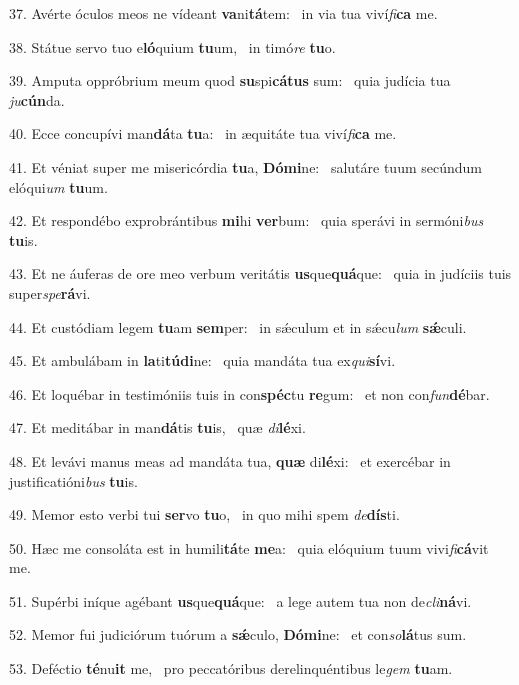 37. Avérte óculos meos ne vídeant \textbf{va}ni\textbf{tá}tem: \ast\  in via tua viví\textit{fi}\textbf{ca} me.\

38. Státue servo tuo e\textbf{ló}quium \textbf{tu}um, \ast\  in timó\textit{re} \textbf{tu}o.\

39. Amputa oppróbrium meum quod \textbf{su}spi\textbf{cá}\textbf{tus} sum: \ast\  quia judícia tua \textit{ju}\textbf{cún}da.\

40. Ecce concupívi man\textbf{dá}ta \textbf{tu}a: \ast\  in æquitáte tua viví\textit{fi}\textbf{ca} me.\

41. Et véniat super me misericórdia \textbf{tu}a, \textbf{Dó}\textbf{mi}ne: \ast\  salutáre tuum secúndum elóqui\textit{um} \textbf{tu}um.\

42. Et respondébo exprobrántibus \textbf{mi}hi \textbf{ver}bum: \ast\  quia sperávi in sermóni\textit{bus} \textbf{tu}is.\

43. Et ne áuferas de ore meo verbum veritátis \textbf{us}que\textbf{quá}que: \ast\  quia in judíciis tuis super\textit{spe}\textbf{rá}vi.\

44. Et custódiam legem \textbf{tu}am \textbf{sem}per: \ast\  in sǽculum et in sǽcu\textit{lum} \textbf{sǽ}culi.\

45. Et ambulábam in \textbf{la}ti\textbf{tú}\textbf{di}ne: \ast\  quia mandáta tua ex\textit{qui}\textbf{sí}vi.\

46. Et loquébar in testimóniis tuis in con\textbf{spéc}tu \textbf{re}gum: \ast\  et non con\textit{fun}\textbf{dé}bar.\

47. Et meditábar in man\textbf{dá}tis \textbf{tu}is, \ast\  quæ \textit{di}\textbf{lé}xi.\

48. Et levávi manus meas ad mandáta tua, \textbf{quæ} di\textbf{lé}xi: \ast\  et exercébar in justificatióni\textit{bus} \textbf{tu}is.\

49. Memor esto verbi tui \textbf{ser}vo \textbf{tu}o, \ast\  in quo mihi spem \textit{de}\textbf{dís}ti.\

50. Hæc me consoláta est in humili\textbf{tá}te \textbf{me}a: \ast\  quia elóquium tuum vivi\textit{fi}\textbf{cá}vit me.\

51. Supérbi iníque agébant \textbf{us}que\textbf{quá}que: \ast\  a lege autem tua non de\textit{cli}\textbf{ná}vi.\

52. Memor fui judiciórum tuórum a \textbf{sǽ}culo, \textbf{Dó}\textbf{mi}ne: \ast\  et con\textit{so}\textbf{lá}tus sum.\

53. Deféctio \textbf{té}nu\textbf{it} me, \ast\  pro peccatóribus derelinquéntibus le\textit{gem} \textbf{tu}am.\

